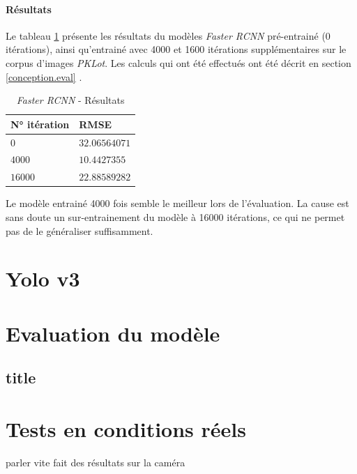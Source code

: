 \paragraph{Résultats}

Le tableau \ref{tab:rcnn_results} présente les résultats du modèles \textit{Faster RCNN} pré-entrainé (0 itérations), ainsi qu'entrainé avec 4000 et 1600 itérations supplémentaires sur le corpus d'images \textit{PKLot}. Les calculs qui ont été effectués ont été décrit en section \ref{conception.eval} .

\begin{table}[ht]
\centering
\begin{tabular}{@{}ll@{}}
\toprule
N° itération & RMSE \\ \midrule
$0$            & $32.06564071$ \\
$4000$         & $10.4427355$ \\
$16000$        & $22.88589282$ \\ \bottomrule
\end{tabular}
\caption{\textit{Faster RCNN} - Résultats}
\label{tab:rcnn_results}
\end{table}

Le modèle entrainé 4000 fois semble le meilleur lors de l'évaluation. La cause est sans doute un sur-entrainement du modèle à 16000 itérations, ce qui ne permet pas de le généraliser suffisamment.

\section{Yolo v3}

\section{Evaluation du modèle}



\subsection{title}

\section{Tests en conditions réels}
parler vite fait des résultats sur la caméra